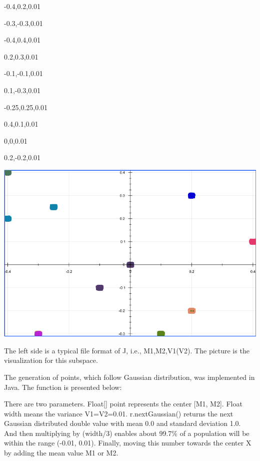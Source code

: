 \documentclass{lmproj}
\begin{document}
\begin{minipage}[b]{0.5\linewidth}
-0.4,0.2,0.01

-0.3,-0.3,0.01

-0.4,0.4,0.01

0.2,0.3,0.01

-0.1,-0.1,0.01

0.1,-0.3,0.01

-0.25,0.25,0.01

0.4,0.1,0.01

0,0,0.01

0.2,-0.2,0.01

\end{minipage}
\hfill
\begin{minipage}[b]{0.5\linewidth}
	\includegraphics[height=10\baselineskip]{L.png}
\end{minipage}

The left side is a typical file format of J, i.e., M1,M2,V1(V2). The picture is the visualization for this subspace.

The generation of points, which follow Gaussian distribution, was implemented in Java. The function is presented below:


There are two parameters. Float[] point represents the center [M1, M2]. Float width means the variance V1=V2=0.01. r.nextGaussian() returns the next Gaussian distributed double value with mean 0.0 and standard deviation 1.0. And then multiplying by (width/3) enables about 99.7\% of a population will be within the range (-0.01, 0.01). Finally, moving this number towards the center X by adding the mean value M1 or M2. 
\end{document}
